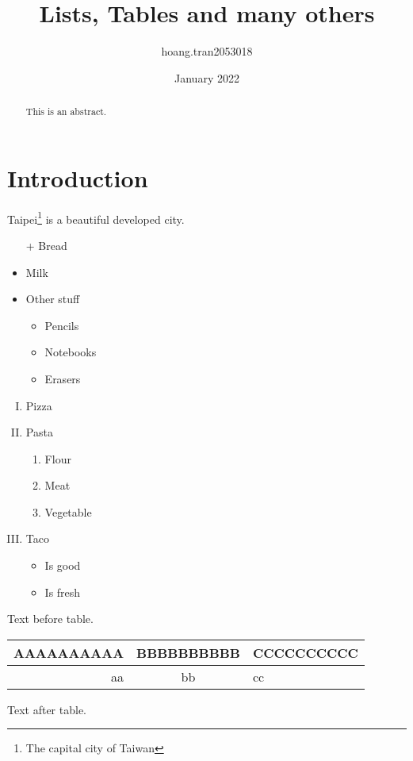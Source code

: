 \documentclass{article}
\title{Lists, Tables and many others}
\author{hoang.tran2053018 }
\date{January 2022}
\begin{document}
\maketitle
\begin{abstract}
    This is an abstract.
\end{abstract}

\section{Introduction}
Taipei\footnote[3]{The capital city of Taiwan} is a beautiful developed city.

\begin{itemize}
    \item[+] Bread
    \item Milk
    \item Other stuff
    \begin{itemize}
        \item Pencils
        \item Notebooks
        \item Erasers
    \end{itemize}
\end{itemize}

\begin{enumerate}[I)]
    \item Pizza
    \item Pasta
    \begin{enumerate}
        \item Flour
        \item Meat
        \item Vegetable
    \end{enumerate}
    \item Taco
    \begin{itemize}
        \item Is good
        \item Is fresh
    \end{itemize}
\end{enumerate}

Text before table.
\begin{tabular}{|r|c|l|} %
\hline
AAAAAAAAAA & BBBBBBBBBB & CCCCCCCCCC\\\hline\hline
aa & bb & cc
\end{tabular}
Text after table.
\end{document}
